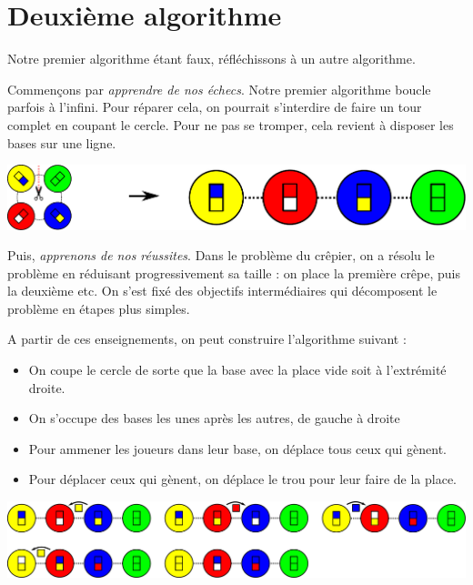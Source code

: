 \documentclass[a5paper,pagesize,DIV=14]{scrbook}
\begin{document}
\newpage

\section*{Deuxième algorithme}

Notre premier algorithme étant faux, réfléchissons à un autre algorithme. 

Commençons par \textit{apprendre de nos échecs}. Notre premier algorithme boucle parfois à l'infini. Pour réparer cela, on pourrait s'interdire de faire un tour complet en coupant le cercle. Pour ne pas se tromper, cela revient à disposer les bases sur une ligne.

\begin{center}
  \includegraphics[width=\linewidth]{img/baseball_ligne.pdf}
\end{center}

Puis, \textit{apprenons de nos réussites}. Dans le problème du crêpier, on a résolu le problème en réduisant progressivement sa taille : on place la première crêpe, puis la deuxième etc. On s'est fixé des objectifs intermédiaires qui décomposent le problème en étapes plus simples.

A partir de ces enseignements, on peut construire l'algorithme suivant :

\begin{itemize}
  \item On coupe le cercle de sorte que la base avec la place vide soit à l'extrémité droite.
  \item On s'occupe des bases les unes après les autres, de gauche à droite
  \item Pour ammener les joueurs dans leur base, on déplace tous ceux qui gènent.
  \item Pour déplacer ceux qui gènent, on déplace le trou pour leur faire de la place.
\end{itemize}

\begin{center}
  \includegraphics[width=\linewidth]{img/baseball_ex3.pdf}
\end{center}
\end{document}
